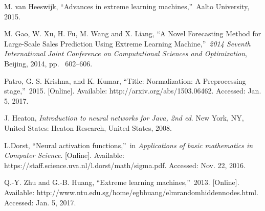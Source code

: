 \documentclass{ws-ijait}
\begin{document}
\begin{thebibliography}{00}
 M. van Heeswijk, \textquotedblleft Advances in extreme learning machines,\textquotedblright \ Aalto University, 2015.

 M. Gao, W. Xu, H. Fu, M. Wang and X. Liang, \textquotedblleft A Novel Forecasting Method for Large-Scale Sales Prediction Using Extreme Learning Machine,\textquotedblright \ {\it 2014 Seventh International Joint Conference on Computational Sciences and Optimization}, Beijing, 2014, pp. ~602--606.

 Patro, G. S. Krishna, and K. Kumar, \textquotedblleft Title: Normalization: A Preprocessing stage,\textquotedblright \ 2015. [Online]. Available: http://arxiv.org/abs/1503.06462. Accessed: Jan. 5, 2017.

 J. Heaton, {\it Introduction to neural networks for Java, 2nd ed}. New York, NY, United States: Heaton Research, United States, 2008.

 L.Dorst, \textquotedblleft Neural activation functions,\textquotedblright \ in {\it Applications of basic mathematics in Computer Science}. [Online]. Available: https://staff.science.uva.nl/l.dorst/math/sigma.pdf. Accessed: Nov. 22, 2016.

 Q.-Y. Zhu and G.-B. Huang, \textquotedblleft Extreme learning machines,\textquotedblright \ 2013. [Online]. Available: http://www.ntu.edu.sg/home/egbhuang/elm\textunderscore random\textunderscore hidden\textunderscore nodes.html. Accessed: Jan. 5, 2017.
\end{thebibliography}
\end{document}
